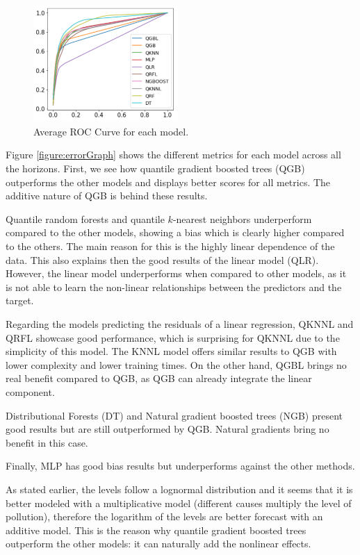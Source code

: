 \documentclass[a4paper,3p,sort&compress]{elsarticle}
\begin{document}
\begin{figure}
  \centering
  \includegraphics[width=0.49\textwidth]{average_roc}
  \caption{\label{figure:average_roc}Average ROC Curve for each 
  model. }
\end{figure}

Figure \ref{figure:errorGraph} shows the different metrics for each
model across all the horizons. First, we see how 
quantile gradient
boosted trees (QGB) outperforms the other models and displays better scores
for all metrics. The additive nature of QGB is behind these
results.

Quantile random forests and quantile $k$-nearest
neighbors underperform compared to the other models, showing a bias
which is clearly higher compared to the others.  The main reason for
this is the highly linear dependence of the data. This also explains
then the good results of the linear model (QLR).  However, the linear
model underperforms when compared to other models, as it is
not able to learn the non-linear relationships between the predictors
and the target.

Regarding the models predicting the residuals 
of a linear regression, QKNNL and QRFL showcase good performance, 
which is surprising for QKNNL 
due to the simplicity 
of this model. The KNNL model offers similar results to QGB with lower complexity 
and lower training times.
On the other hand, QGBL brings no real benefit compared 
to QGB, as QGB can already integrate the linear component.

Distributional Forests (DT) and Natural gradient boosted trees (NGB) 
present good results but are still outperformed by QGB. Natural gradients 
bring no benefit in this case. 

Finally, MLP has good bias results but underperforms against the other methods.

As stated earlier, the \no levels follow a lognormal
distribution and it seems that it is better modeled with a
multiplicative model (different causes multiply the level of
pollution), therefore the logarithm of the \no levels
are better forecast with an additive model. 
This is the reason why
quantile gradient boosted trees outperform 
the other models: it can naturally
add the nonlinear effects.
\end{document}
